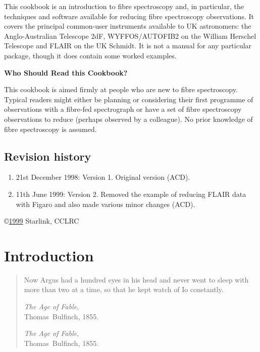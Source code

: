 \documentclass[twoside,11pt]{article}
\newcommand{\stardocinitials}  {SC}
\newcommand{\stardocnumber}    {14.2}
\newcommand{\stardocabstract}
{This cookbook is an introduction to fibre spectroscopy and, in
particular, the techniques and software available for reducing fibre
spectroscopy observations.  It covers the principal common-user
instruments available to UK astronomers: the Anglo-Australian Telescope
2dF, WYFFOS/AUTOFIB2 on the William Herschel Telescope and FLAIR on
the UK Schmidt.  It is not a manual for any particular package, though
it does contain some worked examples.

\latex{\vspace{5mm}}

\begin{center}
{\bf Who Should Read this Cookbook?}
\end{center}

This cookbook is aimed firmly at people who are new to fibre
spectroscopy.  Typical readers might either be planning or considering
their first programme of observations with a fibre-fed spectrograph or
have a set of fibre spectroscopy observations to reduce (perhaps observed
by a colleague).  No prior knowledge of fibre spectroscopy is assumed.}
\newcommand{\stardocname}{\stardocinitials /\stardocnumber}
\newenvironment{latexonly}{}{}
\newcommand{\html}[1]{}
\newcommand{\latex}[1]{#1}
\newcommand{\xlabel}[1]{}
\renewcommand{\thepage}{\roman{page}}
\begin{document}
\stardocabstract
\newpage
\vspace{3cm}

\latex{\subsection*{Revision history}}
\html{\section*{Revision history}}

\begin{enumerate}

   \item 21st December 1998: Version 1. Original version (ACD).

   \item 11th June 1999: Version 2.  Removed the example of reducing
   FLAIR data with Figaro and also made various minor changes (ACD).

\end{enumerate}

\vspace{10cm}
\copyright \underline{1999} Starlink, CCLRC

\cleardoublepage
\begin{latexonly}
   \setlength{\parskip}{0mm}
   \tableofcontents

   \newpage
   \listoffigures
   \listoftables

   \setlength{\parskip}{\medskipamount}
   \markright{\stardocname}
\end{latexonly}


\cleardoublepage
\newpage
\renewcommand{\thepage}{\arabic{page}}
\setcounter{page}{1}

\section{\xlabel{INTRO}\label{INTRO}Introduction}

\begin{quote}
Now Argus had a hundred eyes in his head and never went to sleep with
more than two at a time, so that he kept watch of Io constantly.

\begin{latexonly}
{\it The Age of Fable},    \raggedleft \\
Thomas~Bulfinch, 1855.     \raggedleft
\end{latexonly}
\begin{htmlonly}
{\it The Age of Fable}, \\
Thomas~Bulfinch, 1855.
\end{htmlonly}
\end{quote}
\end{document}
